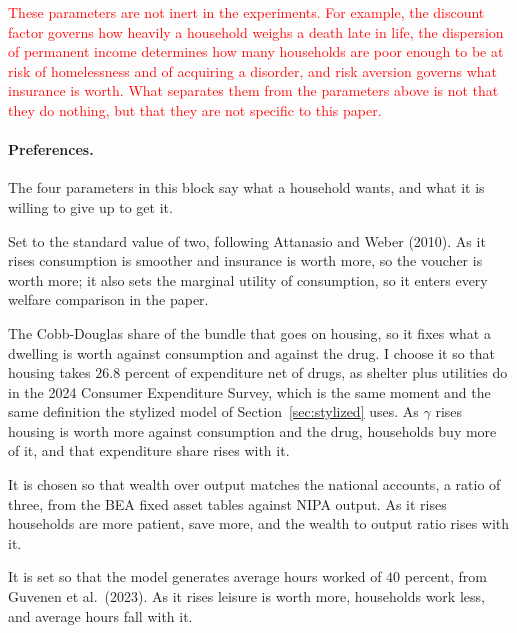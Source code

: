 \documentclass[10pt]{article}
\begin{document}
\textcolor{red}{These parameters are not inert in the experiments. For example, the discount
factor governs how heavily a household weighs a death late in life, the dispersion
of permanent income determines how many households are poor enough to be at risk of
homelessness and of acquiring a disorder, and risk aversion governs what insurance
is worth. What separates them from the parameters above is not that they do nothing,
but that they are not specific to this paper.}




\paragraph{Preferences.} The four parameters in this block say what a household wants, and what it is willing to give up to get it.
\begin{description}\setlength{\itemsep}{0.25em}\setlength{\parskip}{0em}
\item[$\sigma$, risk aversion.] Set to the standard value of two, following
Attanasio and Weber (2010). As it rises consumption is smoother and insurance is
worth more, so the voucher is worth more; it also sets the marginal utility of
consumption, so it enters every welfare comparison in the paper.
\item[$\gamma$, the weight on housing services.] The Cobb-Douglas share of the
bundle that goes on housing, so it fixes what a dwelling is worth against
consumption and against the drug. I choose it so that housing takes $26.8$ percent of expenditure net of drugs, as
shelter plus utilities do in the 2024 Consumer Expenditure Survey, which is the same
moment and the same definition the stylized model of Section~\ref{sec:stylized}
uses. As $\gamma$
rises housing is worth more against consumption and the drug, households buy more of
it, and that expenditure share rises with it.
\item[$\beta$, the discount factor.] It is chosen so that wealth over output
matches the national accounts, a ratio of three, from the BEA fixed asset tables
against NIPA output. As it rises households are more patient, save more, and the
wealth to output ratio rises with it.
\item[$\omega_{\ell}$, the weight on leisure.] It is set so that the model
generates average hours worked of $40$ percent, from Guvenen et al.\ (2023). As it
rises leisure is worth more, households work less, and average hours fall with
it.
\end{description}
\end{document}
